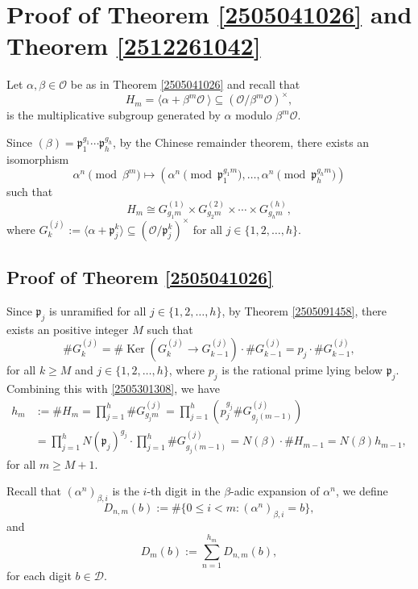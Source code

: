 \documentclass[12pt]{amsart}
\theoremstyle{plain}
\theoremstyle{definition}
\theoremstyle{remark}
\numberwithin{equation}{section}
\DeclareMathOperator{\ke}{Ker}
\begin{document}
	
	
	\section{Proof of Theorem \ref{2505041026} and Theorem \ref{2512261042}}
	
	Let $\alpha, \beta \in \mathcal{O}$ be as in Theorem \ref{2505041026} and recall that
	\[H_m = \langle \alpha+\beta^m\mathcal{O}\ \rangle \subseteq (\mathcal{O}/\beta^m\mathcal{O})^\times,\]
	is the multiplicative subgroup generated by $\alpha$ modulo $\beta^m\mathcal{O}$.    
	
	Since $(\beta)=\mathfrak{p}_1^{g_1}\cdots\mathfrak{p}_h^{g_h}$, by the Chinese remainder theorem, there exists an isomorphism  
	\[
	\alpha^n\!\! \!\! \pmod{\beta^m} \mapsto \left( \alpha^n \!\! \!\! \pmod{\mathfrak{p}_1^{g_1 m}}, \ldots, \alpha^n \!\! \!\! \pmod{\mathfrak{p}_h^{g_h m}} \right)
	\]
	such that
	\begin{equation}\label{2505301308}
		H_m \cong G_{g_1m}^{(1)} \times G_{g_2m}^{(2)} \times \cdots \times G_{g_hm}^{(h)},
	\end{equation}
	where $G_{k}^{(j)} := \langle \alpha+\mathfrak{ p}_j^{k} \rangle \subseteq (\mathcal{O}/\mathfrak{p}_j^{k})^\times$ for all $j\in\{1,2,\dots,h\}$. 
	
	\subsection{Proof of Theorem \ref{2505041026}}
	Since $\mathfrak{ p}_j$ is unramified for all $j\in\{1,2,\dots,h\}$, by Theorem \ref{2505091458}, there exists an positive integer $M$ such that
	\[\#G_{k}^{(j)}=\#\ke(G_{k}^{(j)}\to G_{k-1}^{(j)})\cdot\#G_{k-1}^{(j)}=p_j\cdot\#G_{k-1}^{(j)},\]
	for all $k\ge M$ and $j\in\{1,2,\dots,h\}$, where $p_j$ is the rational prime lying below $\mathfrak{p}_j$. Combining this with 
	\eqref{2505301308}, we have
	\begin{equation}\label{2505301327}
		\begin{split}
			h_m&:=\# H_m = \prod_{j=1}^h \# G_{g_jm}^{(j)} = \prod_{j=1}^h \left(p_j^{g_j} \# G_{g_j(m-1)}^{(j)}\right)\\
			& =\prod_{j=1}^h N(\mathfrak{ p}_j)^{g_j}\cdot\prod_{j=1}^h\# G_{g_j(m-1)}^{(j)}= N(\beta) \cdot\# H_{m-1}=N(\beta) h_{m-1},
		\end{split}
	\end{equation}
	for all $m\ge M+1$. 
	
	Recall that $(\alpha^n)_{\beta,i}$ is the $i$-th digit in the $\beta$-adic expansion of $\alpha^n$, we define 
	\[ D_{n,m}(b):=\#\{0 \leq i < m :  (\alpha^n)_{\beta,i} = b\},\]
	and 
	\[D_{m}(b):=\sum_{n=1}^{h_m} D_{n,m}(b),\]
	for each digit $b\in\mathcal{D}$. 
	
\end{document}
